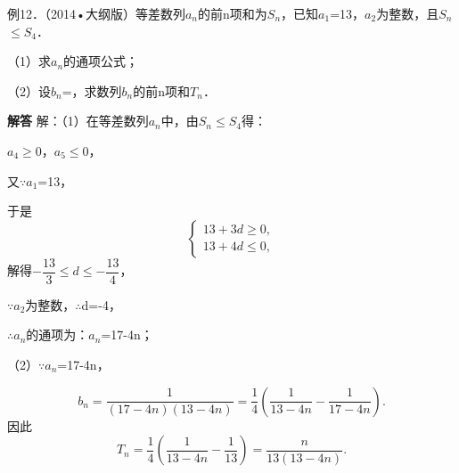 例12．（2014•大纲版）等差数列{\ensuremath{a_{n}}}的前n项和为\ensuremath{S_{n}}，已知\ensuremath{a_{1}}=13，\ensuremath{a_{2}}为整数，且\ensuremath{S_{n}}\ensuremath{\le}\ensuremath{S_{4}}．\par
（1）求{\ensuremath{a_{n}}}的通项公式；\par
（2）设\ensuremath{b_{n}}=，求数列{\ensuremath{b_{n}}}的前n项和\ensuremath{T_{n}}．\par
\QuestionSpace{4.8cm}
\ifshowanswers
\par\begingroup\color{solutioncolor}\noindent\textbf{解答}\quad
解：（1）在等差数列{\ensuremath{a_{n}}}中，由\ensuremath{S_{n}}\ensuremath{\le}\ensuremath{S_{4}}得：\par
\ensuremath{a_{4}}\ensuremath{\ge}0，\ensuremath{a_{5}}\ensuremath{\le}0，\par
又\ensuremath{\because}\ensuremath{a_{1}}=13，\par
于是
\[
\begin{cases}
13+3d\geq0,\\
13+4d\leq0,
\end{cases}
\]
解得$-\dfrac{13}{3}\leq d\leq-\dfrac{13}{4}$，\par
\ensuremath{\because}\ensuremath{a_{2}}为整数，\ensuremath{\therefore}d=-4，\par
\ensuremath{\therefore}{\ensuremath{a_{n}}}的通项为：\ensuremath{a_{n}}=17-4n；\par
（2）\ensuremath{\because}\ensuremath{a_{n}}=17-4n，\par
\[
b_n=\frac1{(17-4n)(13-4n)}
=\frac14\left(\frac1{13-4n}-\frac1{17-4n}\right).
\]
因此
\[
T_n=\frac14\left(\frac1{13-4n}-\frac1{13}\right)
=\boxed{\frac{n}{13(13-4n)}}.
\]
\par\endgroup\fi

